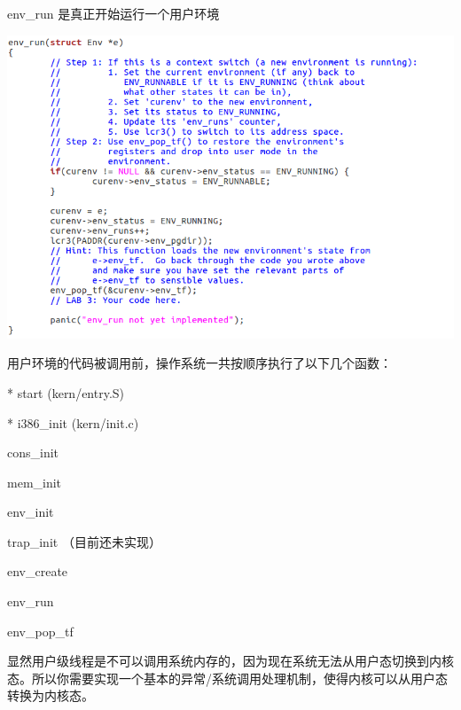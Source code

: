 \begin{ExerciseList}
  env\_run 是真正开始运行一个用户环境

  \includegraphics[width=6in]{figures/lab2/image59.png}

  用户环境的代码被调用前，操作系统一共按顺序执行了以下几个函数：

  * start (kern/entry.S)

  * i386\_init (kern/init.c)

  cons\_init

  mem\_init

  env\_init

  trap\_init （目前还未实现）

  env\_create

  env\_run

  env\_pop\_tf

显然用户级线程是不可以调用系统内存的，因为现在系统无法从用户态切换到内核态。所以你需要实现一个基本的异常/系统调用处理机制，使得内核可以从用户态转换为内核态。


\end{ExerciseList}

